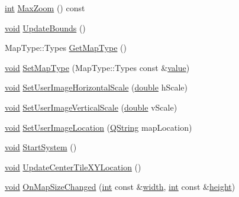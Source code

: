 \begin{DoxyCompactItemize}
\item 
\hyperlink{ioapi_8h_a787fa3cf048117ba7123753c1e74fcd6}{int} \hyperlink{group___o_p_map_widget_ga50e3825136212baafad997c35bf606ef}{Max\-Zoom} () const 
\item 
\hyperlink{group___u_a_v_objects_plugin_ga444cf2ff3f0ecbe028adce838d373f5c}{void} \hyperlink{group___o_p_map_widget_gacbeb6f00e71443854ec421841d9bc431}{Update\-Bounds} ()
\item 
Map\-Type\-::\-Types \hyperlink{group___o_p_map_widget_gad38d6a52a014cb9b52c6df7d47f3e3fe}{Get\-Map\-Type} ()
\item 
\hyperlink{group___u_a_v_objects_plugin_ga444cf2ff3f0ecbe028adce838d373f5c}{void} \hyperlink{group___o_p_map_widget_ga5d71e20762c9714191db9f74f3dd3b6a}{Set\-Map\-Type} (Map\-Type\-::\-Types const \&\hyperlink{glext_8h_aa0e2e9cea7f208d28acda0480144beb0}{value})
\item 
\hyperlink{group___u_a_v_objects_plugin_ga444cf2ff3f0ecbe028adce838d373f5c}{void} \hyperlink{group___o_p_map_widget_ga597dd716558e9c45baa91de591f4ce07}{Set\-User\-Image\-Horizontal\-Scale} (\hyperlink{_super_l_u_support_8h_a8956b2b9f49bf918deed98379d159ca7}{double} h\-Scale)
\item 
\hyperlink{group___u_a_v_objects_plugin_ga444cf2ff3f0ecbe028adce838d373f5c}{void} \hyperlink{group___o_p_map_widget_gae296cd09fb96cfeadbe202f9cba7e1fd}{Set\-User\-Image\-Vertical\-Scale} (\hyperlink{_super_l_u_support_8h_a8956b2b9f49bf918deed98379d159ca7}{double} v\-Scale)
\item 
\hyperlink{group___u_a_v_objects_plugin_ga444cf2ff3f0ecbe028adce838d373f5c}{void} \hyperlink{group___o_p_map_widget_gafe136669e790fac1607a72f7bfca9510}{Set\-User\-Image\-Location} (\hyperlink{group___u_a_v_objects_plugin_gab9d252f49c333c94a72f97ce3105a32d}{Q\-String} map\-Location)
\item 
\hyperlink{group___u_a_v_objects_plugin_ga444cf2ff3f0ecbe028adce838d373f5c}{void} \hyperlink{group___o_p_map_widget_gacc5971a73e9ba3ed87d97bf76e2c2e51}{Start\-System} ()
\item 
\hyperlink{group___u_a_v_objects_plugin_ga444cf2ff3f0ecbe028adce838d373f5c}{void} \hyperlink{group___o_p_map_widget_ga1c516d5c141339ebb623bd521e20edb6}{Update\-Center\-Tile\-X\-Y\-Location} ()
\item 
\hyperlink{group___u_a_v_objects_plugin_ga444cf2ff3f0ecbe028adce838d373f5c}{void} \hyperlink{group___o_p_map_widget_ga32b946b66a00213f725727696df9d9b4}{On\-Map\-Size\-Changed} (\hyperlink{ioapi_8h_a787fa3cf048117ba7123753c1e74fcd6}{int} const \&\hyperlink{glext_8h_a76aaa5c50746272e7d2de9aece921757}{width}, \hyperlink{ioapi_8h_a787fa3cf048117ba7123753c1e74fcd6}{int} const \&\hyperlink{glext_8h_ae23e72c69f79d0aa647aa7929ef3f232}{height})

\end{DoxyCompactItemize}
